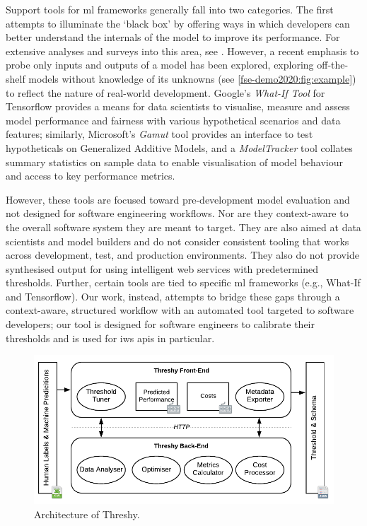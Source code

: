 Support tools for \gls{ml} frameworks generally fall into two categories. The first attempts to illuminate the `black box' by offering ways in which developers can better understand the internals of the model to improve its performance. For extensive analyses and surveys into this area, see \citep{Hohman2018VisualAI,Patel:2008:ISM:1357054.1357160}. However, a recent emphasis to probe only inputs and outputs of a model has been explored, exploring off-the-shelf models without  knowledge of its unknowns (see \cref{fse-demo2020:fig:example}) to reflect the nature of real-world development. Google's \textit{What-If Tool} \citep{DBLP:journals/corr/abs-1907-04135} for Tensorflow provides a means for data scientists to visualise, measure and assess model performance and fairness with various hypothetical scenarios and data features; similarly, Microsoft's \textit{Gamut} tool  \citep{hohman2019gamut} provides an interface to test hypotheticals on Generalized Additive Models, and a  \textit{ModelTracker} tool \citep{amershi2015modeltracker} collates summary statistics on sample data to enable visualisation of model behaviour and access to key performance metrics.

However, these tools are focused toward pre-development model evaluation and not designed for software engineering workflows. Nor are they context-aware to the overall software system they are meant to target. They are also aimed at data scientists and model builders and do not consider consistent tooling that works across development, test, and production environments. They also do not provide synthesised output for using intelligent web services with predetermined thresholds. Further, certain tools are tied to specific \gls{ml} frameworks (e.g., What-If and Tensorflow). Our work, instead, attempts to bridge these gaps through a context-aware, structured workflow with an automated tool targeted to software developers; our tool is designed for software engineers to calibrate their thresholds and is used for \gls{iws} \glspl{api} in particular.

\begin{figure}[t!]
    \centering
    \includegraphics[width=.8\linewidth]{architecture.pdf}
    \caption[Architecture of Threshy]{Architecture of Threshy.}
    \label{fse-demo2020:fig:implementation}
\end{figure}

